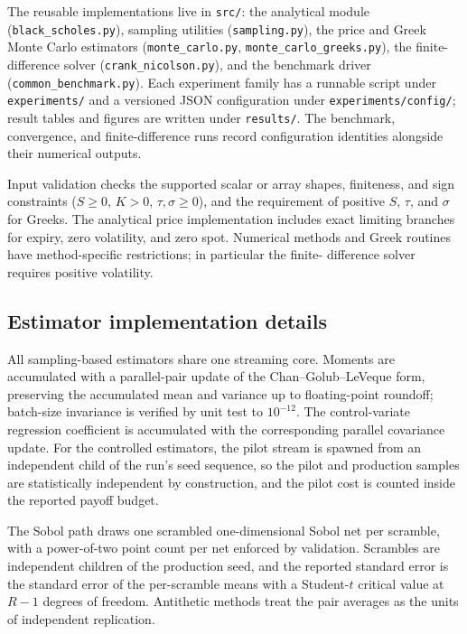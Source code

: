 \documentclass[11pt,a4paper]{article}
\begin{document}
The reusable implementations live in \texttt{src/}: the analytical
module (\texttt{black\_scholes.py}), sampling utilities
(\texttt{sampling.py}), the price and Greek Monte Carlo estimators
(\texttt{monte\_carlo.py}, \texttt{monte\_carlo\_greeks.py}), the
finite-difference solver (\texttt{crank\_nicolson.py}), and the
benchmark driver (\texttt{common\_benchmark.py}). Each experiment
family has a runnable script under \texttt{experiments/} and a
versioned JSON configuration under \texttt{experiments/config/};
result tables and figures are written under \texttt{results/}.
The benchmark, convergence, and finite-difference runs record
configuration identities alongside their numerical outputs.

Input validation checks the supported scalar or array
shapes, finiteness, and sign constraints (\(S\ge0\), \(K>0\),
\(\tau,\sigma\ge0\)), and the requirement of positive \(S\), \(\tau\),
and \(\sigma\) for Greeks. The analytical price implementation includes exact limiting branches
for expiry, zero volatility, and zero spot. Numerical methods and Greek
routines have method-specific restrictions; in particular the finite-
difference solver requires positive volatility.

\subsection{Estimator implementation details}

All sampling-based estimators share one streaming core. Moments are
accumulated with a parallel-pair update of the Chan--Golub--LeVeque
form, preserving the accumulated mean and variance up to floating-point
roundoff; batch-size invariance is verified by unit test to \(10^{-12}\). The
control-variate regression coefficient is accumulated with the
corresponding parallel covariance update. For the controlled
estimators, the pilot stream is spawned from an independent child
of the run's seed sequence, so the pilot and production samples are
statistically independent by construction, and the pilot cost is
counted inside the reported payoff budget.

The Sobol path draws one scrambled one-dimensional Sobol net per
scramble, with a power-of-two point count per net enforced by
validation. Scrambles are independent children of the production
seed, and the reported standard error is the standard error of the
per-scramble means with a Student-\(t\) critical value at
\(R-1\) degrees of freedom. Antithetic methods treat the pair
averages as the units of independent replication.
\end{document}
